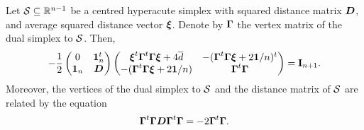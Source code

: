 \begin{lemma}
	Let $\mathcal{S}\subseteq\mathbb{R}^{n-1}$ be a centred hyperacute simplex with  squared distance matrix $\vb*{D}$, and average squared distance vector $\vb*{\xi}$. Denote by $\vb*{\Gamma}$ the vertex matrix of the dual simplex to $\mathcal{S}$. Then, 
	\begin{equation}
	\label{eq:simplex_block_matrix}
	-\frac{1}{2} \begin{pmatrix}
	0 & \vb{1}_n^t \\ 
	\vb{1}_n &  \vb*{D}
	\end{pmatrix}\begin{pmatrix}
	\vb*{\xi}^t \vb*{\Gamma}^t \vb*{\Gamma}\vb*{\xi} + 4\overline{d} & -(\vb*{\Gamma}^t \vb*{\Gamma}\vb*{\xi} + 2\vb{1}/n)^t \\
	-(\vb*{\Gamma}^t \vb*{\Gamma}\vb*{\xi} + 2\vb{1}/n) & \vb*{\Gamma}^t \vb*{\Gamma}
	\end{pmatrix} = \vb{I}_{n+1}.
	\end{equation}
	Moreover, the vertices of the dual simplex to $\mathcal{S}$ and the distance matrix of $\mathcal{S}$ are related by the equation
	\begin{equation}
	\vb*{\Gamma}^t \vb*{\Gamma} \vb*{D} \vb*{\Gamma}^t \vb*{\Gamma} = -2\vb*{\Gamma}^t \vb*{\Gamma}.
	\end{equation}
\end{lemma}

